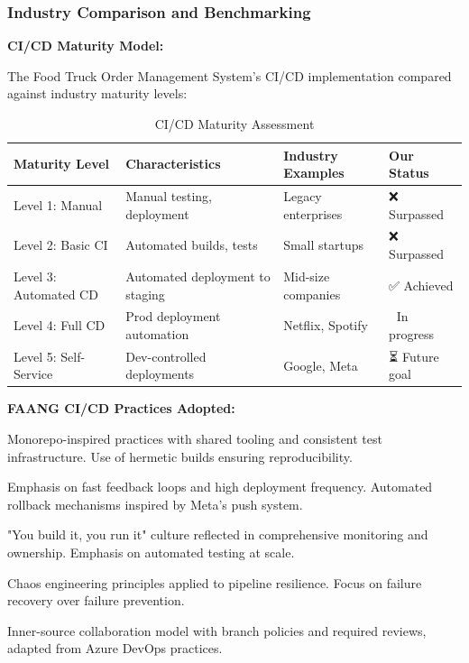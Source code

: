 \documentclass[12pt,a4paper]{article}
\begin{document}
\subsubsection{Industry Comparison and Benchmarking}

\textbf{CI/CD Maturity Model:}

The Food Truck Order Management System's CI/CD implementation compared against industry maturity levels:

\begin{table}[H]
\centering
\small
\begin{tabular}{|p{3cm}|p{4cm}|p{4cm}|p{3cm}|}
\hline
\textbf{Maturity Level} & \textbf{Characteristics} & \textbf{Industry Examples} & \textbf{Our Status} \\
\hline
Level 1: Manual & Manual testing, deployment & Legacy enterprises & ❌ Surpassed \\
\hline
Level 2: Basic CI & Automated builds, tests & Small startups & ❌ Surpassed \\
\hline
Level 3: Automated CD & Automated deployment to staging & Mid-size companies & ✅ Achieved \\
\hline
Level 4: Full CD & Prod deployment automation & Netflix, Spotify & 🔄 In progress \\
\hline
Level 5: Self-Service & Dev-controlled deployments & Google, Meta & ⏳ Future goal \\
\hline
\end{tabular}
\caption{CI/CD Maturity Assessment}
\end{table}

\vspace{0.5em}

\textbf{FAANG CI/CD Practices Adopted:}

\begin{description}[leftmargin=2em, itemsep=8pt, style=nextline]
    \item[\textbf{Google's Approach:}] Monorepo-inspired practices with shared tooling and consistent test infrastructure. Use of hermetic builds ensuring reproducibility.
    
    \item[\textbf{Facebook/Meta's Philosophy:}] Emphasis on fast feedback loops and high deployment frequency. Automated rollback mechanisms inspired by Meta's push system.
    
    \item[\textbf{Amazon's Principles:}] "You build it, you run it" culture reflected in comprehensive monitoring and ownership. Emphasis on automated testing at scale.
    
    \item[\textbf{Netflix's Strategy:}] Chaos engineering principles applied to pipeline resilience. Focus on failure recovery over failure prevention.
    
    \item[\textbf{Microsoft's Evolution:}] Inner-source collaboration model with branch policies and required reviews, adapted from Azure DevOps practices.
\end{description}
\end{document}
